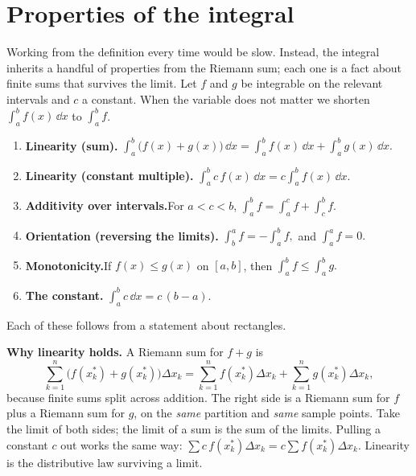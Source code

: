 \section{Properties of the integral}
\label{ch20:properties}

Working from the definition every time would be slow. Instead, the
integral inherits a handful of properties from the Riemann sum;
each one is a fact about finite sums that survives the limit. Let $f$ and $g$ be
integrable on the relevant intervals and $c$ a constant. When the variable does
not matter we shorten $\int_a^b f(x)\,\dd x$ to $\int_a^b f$.

\begin{focusbox}
\begin{enumerate}[label=\textbf{(\arabic*)}]
\item \textbf{Linearity (sum).}\quad
  $\displaystyle \int_a^b \big(f(x)+g(x)\big)\,\dd x
   = \int_a^b f(x)\,\dd x + \int_a^b g(x)\,\dd x.$
\item \textbf{Linearity (constant multiple).}\quad
  $\displaystyle \int_a^b c\,f(x)\,\dd x = c\int_a^b f(x)\,\dd x.$
\item \textbf{Additivity over intervals.}\quad For $a < c < b$,
  $\displaystyle \int_a^b f = \int_a^c f + \int_c^b f.$
\item \textbf{Orientation (reversing the limits).}\quad
  $\displaystyle \int_b^a f = -\int_a^b f,$ \quad and \quad
  $\displaystyle \int_a^a f = 0.$
\item \textbf{Monotonicity.}\quad If $f(x) \le g(x)$ on $[a,b]$, then
  $\displaystyle \int_a^b f \le \int_a^b g.$
\item \textbf{The constant.}\quad
  $\displaystyle \int_a^b c \,\dd x = c\,(b-a).$
\end{enumerate}
\end{focusbox}

Each of these follows from a statement about rectangles.

\textbf{Why linearity holds.} A Riemann sum for $f+g$ is
\[
  \sum_{k=1}^{n} \big(f(x_k^\ast)+g(x_k^\ast)\big)\Delta x_k
  = \sum_{k=1}^{n} f(x_k^\ast)\Delta x_k + \sum_{k=1}^{n} g(x_k^\ast)\Delta x_k,
\]
because finite sums split across addition. The right side is
a Riemann sum for $f$ plus a Riemann sum for $g$, on the \emph{same} partition
and \emph{same} sample points. Take the limit of both sides; the limit of a sum
is the sum of the limits. Pulling a constant $c$ out works the same way:
$\sum c\,f(x_k^\ast)\Delta x_k = c\sum f(x_k^\ast)\Delta x_k$. Linearity is
the distributive law surviving a limit.

